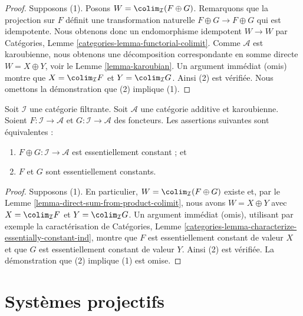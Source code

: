 \begin{proof}
Supposons (1). Posons $W = \colim_\mathcal{I}(F \oplus G)$.
Remarquons que la projection sur $F$ définit une transformation naturelle
$F \oplus G \to F \oplus G$ qui est idempotente. Nous obtenons donc
un endomorphisme idempotent $W \to W$ par
Catégories, Lemme \ref{categories-lemma-functorial-colimit}.
Comme $\mathcal{A}$ est karoubienne, nous obtenons une décomposition
correspondante en somme directe $W = X \oplus Y$, voir le
Lemme \ref{lemma-karoubian}.
Un argument immédiat (omis) montre que
$X = \colim_\mathcal{I} F$ et $Y = \colim_\mathcal{I} G$.
Ainsi (2) est vérifiée. Nous omettons la démonstration que (2) implique (1).
\end{proof}

\begin{lemma}
\label{lemma-direct-sum-from-product-essentially-constant}
Soit $\mathcal{I}$ une catégorie filtrante. Soit $\mathcal{A}$
une catégorie additive et karoubienne. Soient
$F : \mathcal{I} \to \mathcal{A}$ et
$G : \mathcal{I} \to \mathcal{A}$ des foncteurs. Les assertions suivantes
sont équivalentes :
\begin{enumerate}
\item $F \oplus G : \mathcal{I} \to \mathcal{A}$
est essentiellement constant ; et
\item $F$ et $G$ sont essentiellement constants.
\end{enumerate}
\end{lemma}

\begin{proof}
Supposons (1). En particulier,
$W = \colim_\mathcal{I}(F \oplus G)$ existe et, par le
Lemme \ref{lemma-direct-sum-from-product-colimit},
nous avons $W = X \oplus Y$ avec $X = \colim_\mathcal{I} F$ et
$Y = \colim_\mathcal{I} G$. Un argument immédiat (omis), utilisant par
exemple la caractérisation de
Catégories, Lemme \ref{categories-lemma-characterize-essentially-constant-ind},
montre que $F$ est essentiellement constant de valeur $X$ et que $G$ est
essentiellement constant de valeur $Y$. Ainsi (2) est vérifiée.
La démonstration que (2) implique (1) est omise.
\end{proof}

\section{Systèmes projectifs}
\label{section-inverse-systems}

